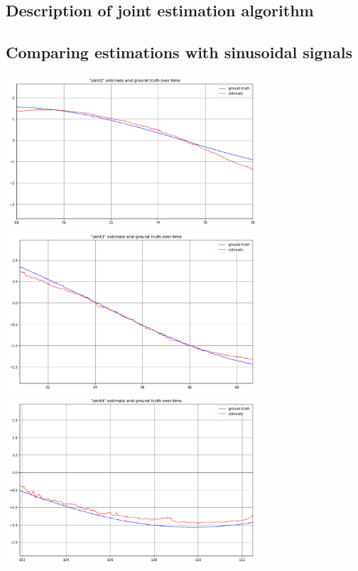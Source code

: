 
\subsection{Description of joint estimation algorithm}

\subsection{Comparing estimations with sinusoidal signals}
\begin{center}
    \includegraphics[width=0.7\textwidth]{plots/q2_1_j2_10sec.png}
    \includegraphics[width=0.7\textwidth]{plots/q2_1_j3_10sec.png}
    \includegraphics[width=0.7\textwidth]{plots/q2_1_j4_10sec.png}
\end{center}

